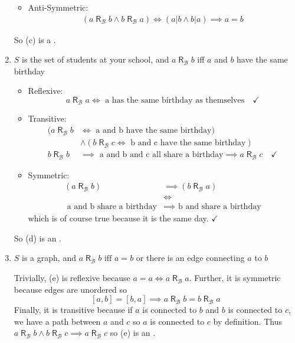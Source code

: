 \documentclass[12pt]{article}
\newcommand{\rb}{\; \mathsf{R}_\mathcal{B}\;}
\begin{document}
\begin{enumerate}[label=(\alph*)]
\begin{itemize}
        \item Anti-Symmetric: 
        \begin{align*}
            (a \rb b \land b \rb a) \iff (a | b \land b | a) \implies a = b
        \end{align*}
    \end{itemize}
    So (c) is a .    
    \color{black}

    \item $S$ is the set of students at your school, and $a\; \mathsf{R}_\mathcal{B} \; b$ iff $a$ and $b$ have the same birthday 
    
    \color{blue}
    \begin{itemize}
        \item Reflexive: 
        \[a \rb a \iff \text{ a has the same birthday as themselves} \quad \checkmark\]

        \item Transitive: 
        \begin{align*}
            (a \rb b &\iff \text{ a and b have the same birthday})\\
             &\land (b \rb c \iff \text{ b and c have the same birthday})\\
            b \rb b &\implies \text{ a and b and c all share a birthday} \implies a \rb c \quad \checkmark
        \end{align*}

        \item Symmetric: 
        \begin{align*}
            (a \rb b) &\implies (b \rb a)\\
            &\iff\\
            \text{ a and b share a birthday} &\implies \text{ b and share a birthday}
        \end{align*}
        which is of course true because it is the same day. $\checkmark$

    \end{itemize}    
    So (d) is an .
    \color{black}

    \item $S$ is a graph, and $a\; \mathsf{R}_\mathcal{B} \; b \text{ iff } a = b$ or there is an edge connecting $a$ to $b$
    
    \color{blue}
        Trivially, (e) is reflexive because $a = a \iff a \rb a$. Further, it is symmetric because edges are unordered so 
        \[[a, b] = [b, a] \implies a \rb b = b \rb a\] 
        Finally, it is transitive because if $a$ is connected to $b$ and $b$ is connected to $c$, we have a path between $a$ and $c$ so $a$ is connected to $c$ by definition. Thus $a \rb b \land b \rb c \implies a\rb c$ so (e) is an .
    \color{black}


\end{enumerate}
\end{document}
